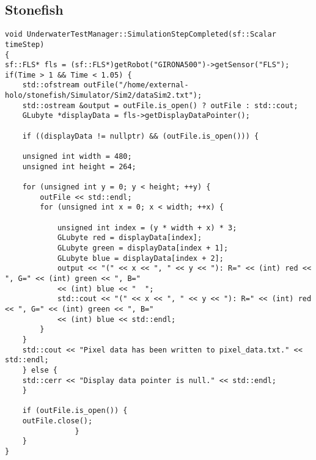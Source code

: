 \documentclass[]{article}
\begin{document}
	\subsection{Stonefish}	
	
	\lstset{language=C++}  
	
	\begin{lstlisting}[frame=single]
void UnderwaterTestManager::SimulationStepCompleted(sf::Scalar timeStep)
{
sf::FLS* fls = (sf::FLS*)getRobot("GIRONA500")->getSensor("FLS");
if(Time > 1 && Time < 1.05) { 
	std::ofstream outFile("/home/external-holo/stonefish/Simulator/Sim2/dataSim2.txt");
	std::ostream &output = outFile.is_open() ? outFile : std::cout;
	GLubyte *displayData = fls->getDisplayDataPointer();
	
	if ((displayData != nullptr) && (outFile.is_open())) {
					
	unsigned int width = 480;
	unsigned int height = 264;
					
	for (unsigned int y = 0; y < height; ++y) {
		outFile << std::endl;
		for (unsigned int x = 0; x < width; ++x) {
							
			unsigned int index = (y * width + x) * 3;
			GLubyte red = displayData[index];
			GLubyte green = displayData[index + 1];
			GLubyte blue = displayData[index + 2];
			output << "(" << x << ", " << y << "): R=" << (int) red << ", G=" << (int) green << ", B="
			<< (int) blue << "  ";
			std::cout << "(" << x << ", " << y << "): R=" << (int) red << ", G=" << (int) green << ", B="
			<< (int) blue << std::endl;
		}
	}
	std::cout << "Pixel data has been written to pixel_data.txt." << std::endl;
	} else {
	std::cerr << "Display data pointer is null." << std::endl;
	}
				
	if (outFile.is_open()) {
	outFile.close();
				}
	}
}

	\end{lstlisting}
\end{document}
